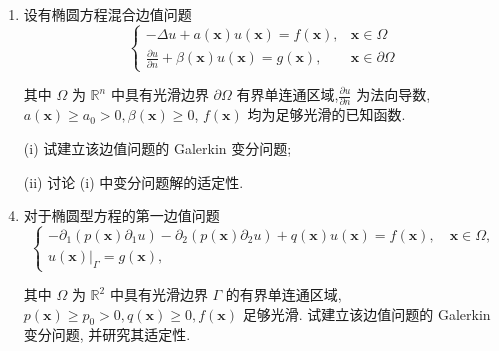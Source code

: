 \documentclass[12pt,a4paper]{article}
\begin{document}
	\begin{enumerate}
		\item 设有椭圆方程混合边值问题
		$$
		\begin{cases}-\Delta u+a(\boldsymbol{x}) u(\boldsymbol{x})=f(\boldsymbol{x}), & \boldsymbol{x} \in \Omega \\ \frac{\partial u}{\partial n}+\beta(\boldsymbol{x}) u(\boldsymbol{x})=g(\boldsymbol{x}), & \boldsymbol{x} \in \partial \Omega\end{cases}
		$$    
		
		其中 $\Omega$ 为 $\mathbb{R}^n$ 中具有光滑边界 $\partial \Omega$ 有界单连通区域,$\frac{\partial u}{\partial n}$ 为法向导数, $a(\boldsymbol{x}) \geqslant a_0>0, \beta(\boldsymbol{x}) \geqslant 0$, $f(\boldsymbol{x})$ 均为足够光滑的已知函数.
		\item[(i)] 试建立该边值问题的 Galerkin 变分问题;
		\item[(ii)] 讨论 (i) 中变分问题解的适定性.
		
		\item 对于椭圆型方程的第一边值问题
		$$
		\left\{\begin{array}{l}
			-\partial_1\left(p(\boldsymbol{x}) \partial_1 u\right)-\partial_2\left(p(\boldsymbol{x}) \partial_2 u\right)+q(\boldsymbol{x}) u(\boldsymbol{x})=f(\boldsymbol{x}), \quad \boldsymbol{x} \in \Omega, \\
			\left.u(\boldsymbol{x})\right|_{\Gamma}=g(\boldsymbol{x}),
		\end{array}\right.
		$$   
		
		其中 $\Omega$ 为 $\mathbb{R}^2$ 中具有光滑边界 $\Gamma$ 的有界单连通区域,$p(\boldsymbol{x}) \geqslant p_0>0, q(\boldsymbol{x}) \geqslant 0, f(\boldsymbol{x})$ 足够光滑. 试建立该边值问题的 Galerkin 变分问题, 并研究其适定性.
		
	\end{enumerate}
	
	
	
\end{document}
